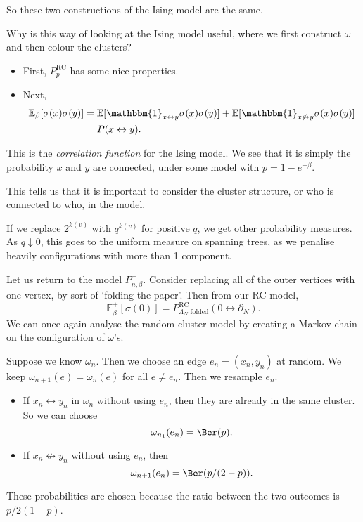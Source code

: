 \documentclass[12pt]{article}
\begin{document}
So these two constructions of the Ising model are the same.

Why is this way of looking at the Ising model useful, where we first construct $\omega$ and then colour the clusters?
\begin{itemize}
	\item First, $P_p^{\mathrm{RC}}$ has some nice properties.
	\item Next,
		\begin{align*}
			\mathbb{E}_{\beta}[\sigma(x) \sigma(y)] &= \mathbb{E}[\mathbbm{1}_{x \leftrightarrow y} \sigma(x) \sigma(y)] + \mathbb{E}[\mathbbm{1}_{x \not \leftrightarrow y} \sigma(x) \sigma(y)] \\
								&= P(x \leftrightarrow y).
		\end{align*}
\end{itemize}
This is the \emph{correlation function} for the Ising model. We see that it is simply the probability $x$ and $y$ are connected, under some model with $p = 1 - e^{-\beta}$.

This tells us that it is important to consider the cluster structure, or who is connected to who, in the model.

If we replace $2^{k(v)}$ with $q^{k(v)}$ for positive $q$, we get other probability measures. As $q \downarrow 0$, this goes to the uniform measure on spanning trees, as we penalise heavily configurations with more than 1 component.

Let us return to the model $P_{n, \beta}^{+}$. Consider replacing all of the outer vertices with one vertex, by sort of `folding the paper'. Then from our RC model,
\[
	\mathbb{E}_\beta^{+}[\sigma(0)] = P^{\mathrm{RC}}_{\Lambda_N \text{ folded}} (0 \leftrightarrow \partial_N).
\]
We can once again analyse the random cluster model by creating a Markov chain on the configuration of $\omega$'s.

Suppose we know $\omega_n$. Then we choose an edge $e_n = (x_n, y_n)$ at random. We keep $\omega_{n+1}(e) = \omega_n(e)$ for all $e \neq e_n$. Then we resample $e_n$.
\begin{itemize}
	\item If $x_n \leftrightarrow y_n$ in $\omega_n$ without using $e_n$, then they are already in the same cluster. So we can choose
		\[
		\omega_{n_1}(e_n) = \Ber(p).
		\]
	\item If $x_n \not \leftrightarrow y_n$ without using $e_n$, then
		\[
		\omega_{n+1}(e_n) = \Ber(p/(2 - p)).
		\]
\end{itemize}
These probabilities are chosen because the ratio between the two outcomes is $p / 2(1 - p)$.
\end{document}
